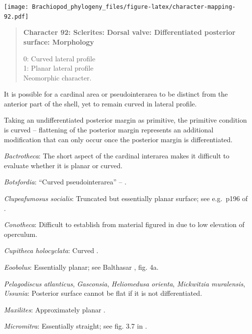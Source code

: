 \documentclass[openany]{book}
\begin{document}
\texttt{[image: Brachiopod\_phylogeny\_files/figure-latex/character-mapping-92.pdf]}

\begin{quote}
\textbf{Character 92: Sclerites: Dorsal valve: Differentiated posterior
surface: Morphology}

0: Curved lateral profile\\
1: Planar lateral profile\\
Neomorphic character.
\end{quote}

It is possible for a cardinal area or pseudointerarea to be distinct
from the anterior part of the shell, yet to remain curved in lateral
profile.

Taking an undifferentiated posterior margin as primitive, the primitive
condition is curved -- flattening of the posterior margin represents an
additional modification that can only occur once the posterior margin is
differentiated.

\hypertarget{Bactrotheca-coding-92}{}
\emph{Bactrotheca}: The short aspect of the cardinal interarea
\citep{Valent2012} makes it difficult to evaluate whether it is planar
or curved.

\hypertarget{Botsfordia-coding-92}{}
\emph{Botsfordia}: ``Curved pseudointerarea'' --
\citet{Skovsted2017Depthrelated}.

\hypertarget{Clupeafumosus_socialis-coding-92}{}
\emph{Clupeafumosus socialis}: Truncated but essentially planar surface;
see e.g.~p196 of \citet{Topper2013Reappraisalof}.

\hypertarget{Conotheca-coding-92}{}
\emph{Conotheca}: Difficult to establish from material figured in
\citet{Devaere2014} due to low elevation of operculum.

\hypertarget{Cupitheca_holocyclata-coding-92}{}
\emph{Cupitheca holocyclata}: Curved \citep{Sun2018}.

\hypertarget{Eoobolus-coding-92}{}
\emph{Eoobolus}: Essentially planar; see Balthasar
\citeyearpar{Balthasar2009Thebrachiopod}, fig. 4a.

\hypertarget{Gasconsia-coding-92}{}
\emph{Pelagodiscus atlanticus}, \emph{Gasconsia}, \emph{Heliomedusa
orienta}, \emph{Mickwitzia muralensis}, \emph{Ussunia}: Posterior
surface cannot be flat if it is not differentiated.

\hypertarget{Maxilites-coding-92}{}
\emph{Maxilites}: Approximately planar \citep{Marek1972}.

\hypertarget{Micromitra-coding-92}{}
\emph{Micromitra}: Essentially straight; see fig. 3.7 in
\citet{Ushatinskaya2016Protegulumand}.
\end{document}
